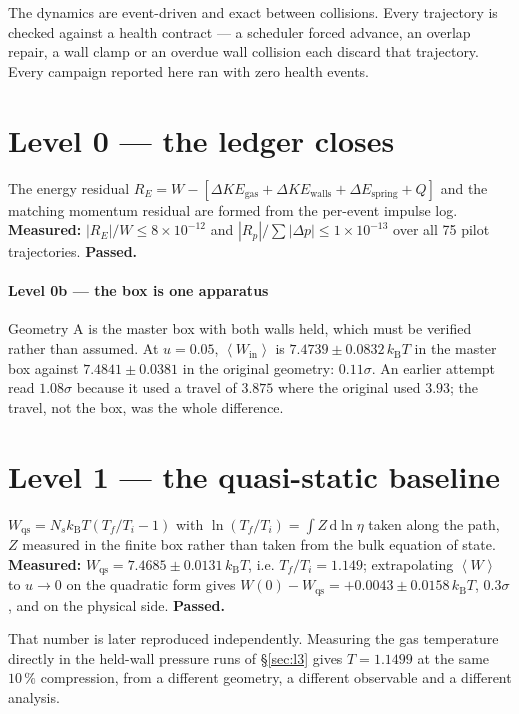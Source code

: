 \documentclass[journal]{IEEEtran}
\newcommand{\kT}{k_{\mathrm B}T}
\newcommand{\avg}[1]{\left\langle #1 \right\rangle}
\newcommand{\dd}{\mathrm{d}}
\begin{document}
The dynamics are event-driven and exact between collisions. Every trajectory is checked against a
health contract --- a scheduler forced advance, an overlap repair, a wall clamp or an overdue wall
collision each discard that trajectory. Every campaign reported here ran with zero health events.

\section{Level 0 --- the ledger closes}\label{sec:l0}
The energy residual
$R_E = W - [\Delta KE_{\mathrm{gas}} + \Delta KE_{\mathrm{walls}} + \Delta E_{\mathrm{spring}} + Q]$
and the matching momentum residual are formed from the per-event impulse log.
\textbf{Measured:} $|R_E|/W \le 8\times10^{-12}$ and $|R_p|/\sum|\Delta p| \le 1\times10^{-13}$ over
all 75 pilot trajectories. \textbf{Passed.}

\paragraph{Level 0b --- the box is one apparatus} Geometry A is the master box with both walls held,
which must be verified rather than assumed. At $u = 0.05$, $\avg{W_{\mathrm{in}}}$ is
$7.4739 \pm 0.0832\,\kT$ in the master box against $7.4841 \pm 0.0381$ in the original geometry:
$0.11\sigma$. An earlier attempt read $1.08\sigma$ because it used a travel of $3.875$ where the
original used $3.93$; the travel, not the box, was the whole difference.

\section{Level 1 --- the quasi-static baseline}\label{sec:l1}
$W_{\mathrm{qs}} = N_s\kT(T_f/T_i - 1)$ with $\ln(T_f/T_i) = \int Z\,\dd\ln\eta$ taken along the
path, $Z$ measured in the finite box rather than taken from the bulk equation of state.
\textbf{Measured:} $W_{\mathrm{qs}} = 7.4685 \pm 0.0131\,\kT$, i.e. $T_f/T_i = 1.149$;
extrapolating $\avg W$ to $u \to 0$ on the quadratic form gives
$W(0) - W_{\mathrm{qs}} = +0.0043 \pm 0.0158\,\kT$, $0.3\sigma$, and on the physical side.
\textbf{Passed.}

That number is later reproduced independently. Measuring the gas temperature directly in the
held-wall pressure runs of \S\ref{sec:l3} gives $T = 1.1499$ at the same $10\,\%$ compression, from
a different geometry, a different observable and a different analysis.
\end{document}
